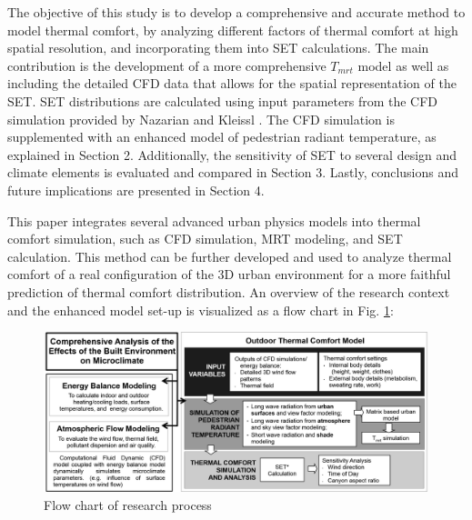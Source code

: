 \documentclass[preprint,3p,12pt,english]{elsarticle}
\begin{document}
The objective of this study is to develop a comprehensive and accurate method to model thermal comfort, by analyzing different factors of thermal comfort at high spatial resolution, and incorporating them into SET calculations. The main contribution is the development of a more comprehensive $T_{mrt}$ model as well as including the detailed CFD data that allows for the spatial representation of the SET. SET distributions are calculated using input parameters from the CFD simulation provided by Nazarian and Kleissl \cite{nazarian2014effects, nazarian2015cfd}. The CFD simulation is supplemented with an enhanced model of pedestrian radiant temperature, as explained in Section 2.  Additionally, the sensitivity of SET to several design and climate elements is evaluated and compared in Section 3. Lastly, conclusions and future implications are presented in Section 4. 

This paper integrates several advanced urban physics models into thermal comfort simulation, such as CFD simulation, MRT modeling, and SET calculation. This method can be further developed and used to analyze thermal comfort of a real configuration of the 3D urban environment for a more faithful prediction of thermal comfort distribution. An overview of the research context and the enhanced model set-up is visualized as a flow chart in Fig. \ref{Fig.Visibility}:
\begin{figure}[H]
\graphicspath{ {image/} }
\centerline{\includegraphics[width=16cm]{flowchartBW.PNG}}
\caption{Flow chart of research process}
\label{Fig.Visibility}
\end{figure}





\end{document}
